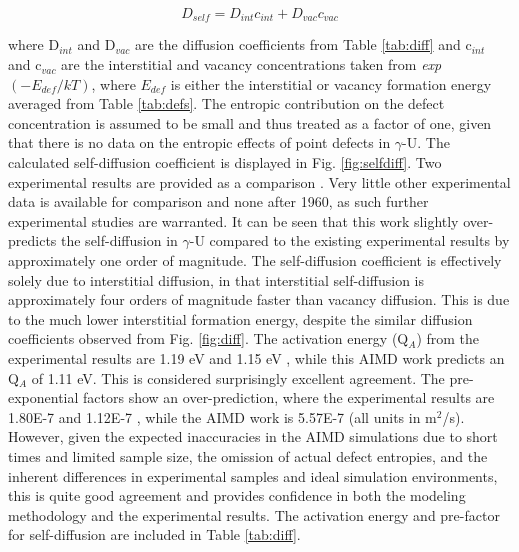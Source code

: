 \documentclass[review]{elsarticle}
\begin{document}
\begin{equation}
\label{eqn:selfd}
D_{self} = D_{int}c_{int} + D_{vac}c_{vac}
\end{equation} 

where D$_{int}$ and D$_{vac}$ are the diffusion coefficients from Table \ref{tab:diff} and c$_{int}$ and c$_{vac}$ are the interstitial and vacancy concentrations taken from \textit{exp}$(-E_{def}/kT)$, where $E_{def}$ is either the interstitial or vacancy formation energy averaged from Table \ref{tab:defs}. The entropic contribution on the defect concentration is assumed to be small and thus treated as a factor of one, given that there is no data on the entropic effects of point defects in $\gamma$-U. The calculated self-diffusion coefficient is displayed in Fig. \ref{fig:selfdiff}. Two experimental results are provided as a comparison \cite{rothman1959,adda1959}. Very little other experimental data is available for comparison and none after 1960, as such further experimental studies are warranted. It can be seen that this work slightly over-predicts the self-diffusion in $\gamma$-U compared to the existing experimental results by approximately one order of magnitude. The self-diffusion coefficient is effectively solely due to interstitial diffusion, in that interstitial self-diffusion is approximately four orders of magnitude faster than vacancy diffusion. This is due to the much lower interstitial formation energy, despite the similar diffusion coefficients observed from Fig. \ref{fig:diff}. The activation energy (Q$_A$) from the experimental results are 1.19 eV \cite{adda1959} and 1.15 eV \cite{rothman1959}, while this AIMD work predicts an Q$_A$ of 1.11 eV. This is considered surprisingly excellent agreement. The pre-exponential factors show an over-prediction, where the experimental results are 1.80E-7 \cite{adda1959} and 1.12E-7 \cite{rothman1959}, while the AIMD work is 5.57E-7 (all units in m$^2$/s). However, given the expected inaccuracies in the AIMD simulations due to short times and limited sample size, the omission of actual defect entropies, and the inherent differences in experimental samples and ideal simulation environments, this is quite good agreement and provides confidence in both the modeling methodology and the experimental results. The activation energy and pre-factor for self-diffusion are included in Table \ref{tab:diff}.
\end{document}
